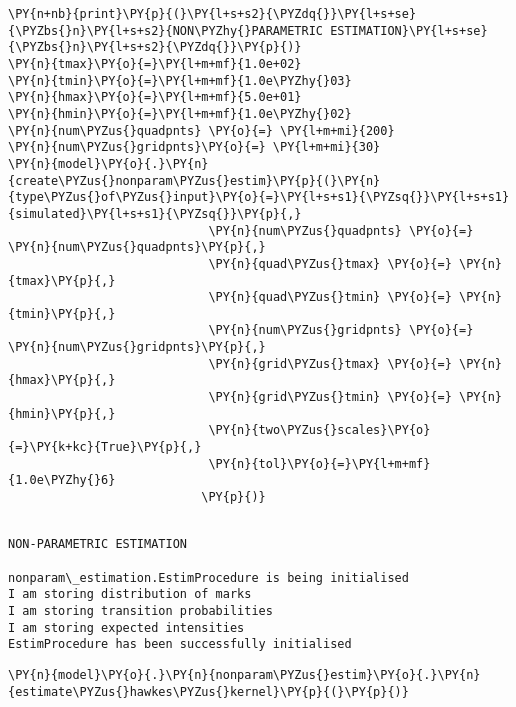 \documentclass[10pt, article,table]{article}
\begin{document}
    \begin{tcolorbox}[breakable, size=fbox, boxrule=1pt, pad at break*=1mm,colback=cellbackground, colframe=cellborder]
\begin{Verbatim}[commandchars=\\\{\}]
\PY{n+nb}{print}\PY{p}{(}\PY{l+s+s2}{\PYZdq{}}\PY{l+s+se}{\PYZbs{}n}\PY{l+s+s2}{NON\PYZhy{}PARAMETRIC ESTIMATION}\PY{l+s+se}{\PYZbs{}n}\PY{l+s+s2}{\PYZdq{}}\PY{p}{)}
\PY{n}{tmax}\PY{o}{=}\PY{l+m+mf}{1.0e+02}
\PY{n}{tmin}\PY{o}{=}\PY{l+m+mf}{1.0e\PYZhy{}03}
\PY{n}{hmax}\PY{o}{=}\PY{l+m+mf}{5.0e+01}
\PY{n}{hmin}\PY{o}{=}\PY{l+m+mf}{1.0e\PYZhy{}02}
\PY{n}{num\PYZus{}quadpnts} \PY{o}{=} \PY{l+m+mi}{200}
\PY{n}{num\PYZus{}gridpnts}\PY{o}{=} \PY{l+m+mi}{30}
\PY{n}{model}\PY{o}{.}\PY{n}{create\PYZus{}nonparam\PYZus{}estim}\PY{p}{(}\PY{n}{type\PYZus{}of\PYZus{}input}\PY{o}{=}\PY{l+s+s1}{\PYZsq{}}\PY{l+s+s1}{simulated}\PY{l+s+s1}{\PYZsq{}}\PY{p}{,}
                            \PY{n}{num\PYZus{}quadpnts} \PY{o}{=} \PY{n}{num\PYZus{}quadpnts}\PY{p}{,}
                            \PY{n}{quad\PYZus{}tmax} \PY{o}{=} \PY{n}{tmax}\PY{p}{,}
                            \PY{n}{quad\PYZus{}tmin} \PY{o}{=} \PY{n}{tmin}\PY{p}{,}
                            \PY{n}{num\PYZus{}gridpnts} \PY{o}{=} \PY{n}{num\PYZus{}gridpnts}\PY{p}{,}
                            \PY{n}{grid\PYZus{}tmax} \PY{o}{=} \PY{n}{hmax}\PY{p}{,}
                            \PY{n}{grid\PYZus{}tmin} \PY{o}{=} \PY{n}{hmin}\PY{p}{,}
                            \PY{n}{two\PYZus{}scales}\PY{o}{=}\PY{k+kc}{True}\PY{p}{,}
                            \PY{n}{tol}\PY{o}{=}\PY{l+m+mf}{1.0e\PYZhy{}6}
                           \PY{p}{)}
\end{Verbatim}
\end{tcolorbox}

    \begin{Verbatim}[commandchars=\\\{\}]

NON-PARAMETRIC ESTIMATION

nonparam\_estimation.EstimProcedure is being initialised
I am storing distribution of marks
I am storing transition probabilities
I am storing expected intensities
EstimProcedure has been successfully initialised
    \end{Verbatim}
    
    \begin{tcolorbox}[breakable, size=fbox, boxrule=1pt, pad at break*=1mm,colback=cellbackground, colframe=cellborder]
\begin{Verbatim}[commandchars=\\\{\}]
\PY{n}{model}\PY{o}{.}\PY{n}{nonparam\PYZus{}estim}\PY{o}{.}\PY{n}{estimate\PYZus{}hawkes\PYZus{}kernel}\PY{p}{(}\PY{p}{)}
\end{Verbatim}
\end{tcolorbox}
\end{document}
